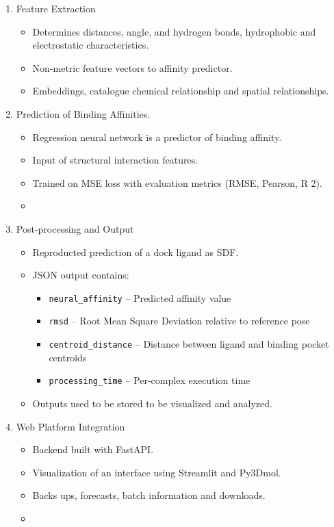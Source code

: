 \documentclass[12pt,a4]{report}
\begin{document}
\begin{enumerate}
    \item Feature Extraction
    \begin{itemize}
        \item Determines distances, angle, and hydrogen bonds, hydrophobic and electrostatic characteristics.
        \item Non-metric feature vectors to affinity predictor.
        \item Embeddings, catalogue chemical relationship and spatial relationships.
    \end{itemize}

    \item Prediction of Binding Affinities.
    \begin{itemize}
        \item Regression neural network is a predictor of binding affinity.
        \item Input of structural interaction features.
        \item Trained on MSE loss with evaluation metrics (RMSE, Pearson, R 2).
        \item 
    \end{itemize}

    \item Post-processing and Output
    \begin{itemize}
        \item Reproducted prediction of a dock ligand as SDF.
        \item JSON output contains:
        \begin{itemize}
            \item \texttt{neural\_affinity} – Predicted affinity value
            \item \texttt{rmsd} – Root Mean Square Deviation relative to reference pose
            \item \texttt{centroid\_distance} – Distance between ligand and binding pocket centroids
            \item \texttt{processing\_time} – Per-complex execution time
        \end{itemize}
        \item Outputs used to be stored to be visualized and analyzed.
    \end{itemize}

    \item Web Platform Integration
    \begin{itemize}
        \item Backend built with FastAPI.
        \item Visualization of an interface using Streamlit and Py3Dmol.
        \item Backs ups, forecasts, batch information and downloads.
        \item 
    \end{itemize}


\end{enumerate}
\end{document}
